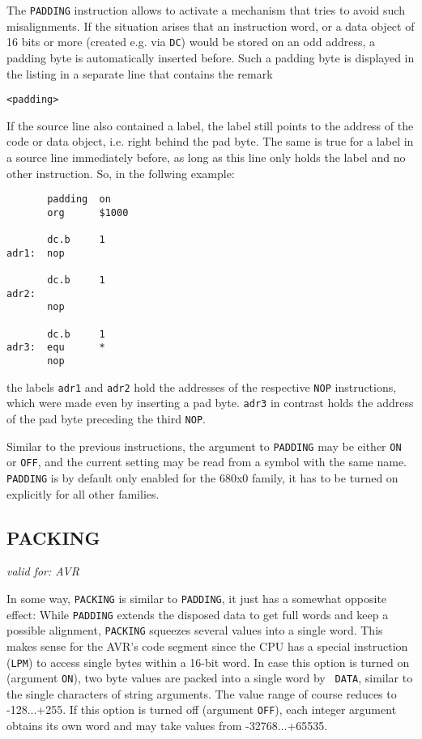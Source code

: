 \documentclass[12pt,twoside]{report}
\makeatletter
\newcommand{\tty}[1]{{\tt #1}}
\newcommand{\ttindex}[1]{\index{#1@{\tt #1}}}
\makeatother
\begin{document}
The \tty{PADDING} instruction allows to activate a mechanism that tries to
avoid such misalignments.  If the situation arises that an instruction
word, or a data object of 16 bits or more (created e.g. via \tty{DC}) would
be stored on an odd address, a padding byte is automatically inserted before.
Such a padding byte is displayed in the listing in a separate line that
contains the remark
\begin{verbatim}
<padding>
\end{verbatim}
If the source line also contained a label, the label still points to the
address of the code or data object, i.e. right behind the pad byte.  The same
is true for a label in a source line immediately before, as long as this
line {\em} only holds the label and no other instruction.  So, in the
follwing example:
\begin{verbatim}
       padding  on
       org      $1000

       dc.b     1
adr1:  nop

       dc.b     1
adr2: 
       nop

       dc.b     1
adr3:  equ      *
       nop
\end{verbatim}
the labels \tty{adr1} and \tty{adr2} hold the addresses of the respective
\tty{NOP} instructions, which were made even by inserting a pad byte.
\tty{adr3} in contrast holds the address of the pad byte preceding the
third \tty{NOP}.

Similar to the previous instructions, the argument to \tty{PADDING} may be
either \tty{ON} or \tty{OFF}, and the current setting may be read from a
symbol with the same name.  \tty{PADDING} is by default only enabled for
the 680x0 family, it has to be turned on explicitly for all other families.


\subsection{PACKING}
\ttindex{PACKING}

{\em valid for: AVR}

In some way, {\tt PACKING} is similar to {\tt PADDING}, it just has a
somewhat opposite effect: While {\tt PADDING} extends the disposed data to
get full words and keep a possible alignment, {\tt PACKING} squeezes
several values into a single word.  This makes sense for the AVR's code
segment since the CPU has a special instruction ({\tt LPM}) to access
single bytes within a 16-bit word.  In case this option is turned on
(argument {\tt ON}), two byte values are packed into a single word by {\tt
DATA}, similar to the single characters of string arguments.  The value
range of course reduces to -128...+255.  If this option is turned off
(argument {\tt OFF}), each integer argument obtains its own word and may
take values from -32768...+65535.
\end{document}
